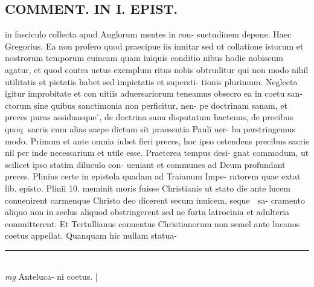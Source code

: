 \documentclass{article}
\begin{document}
\begin{pages}
\section*{COMMENT. IN I. EPIST. }\pstart in fasciculo collecta apud Anglorum mentes in con- suetudinem depone. Haec Gregorius. Ea non profero quod praecipue iis innitar sed ut collatione istorum et nostrorum temporum euincam quam iniquis conditio nibus hodie nobiscum agatur, et quod contra uetus exemplum ritus nobis obtruditur qui non modo nihil utilitatis et pietatis habet sed impietatis et supersti- tionis plurimum. Neglecta igitur improbitate et con uitiis aduersariorum teneamus obsecro ea in coetu san- ctorum sine quibus sanctimonia non perficitur, nen- pe doctrinam sanam, et preces puras assiduasque ́, de doctrina sana disputatum hactenus, de precibus quoq sacris cum alias saepe dictum sit praesentia Pauli uer- ba perstringemus modo. Primum et ante omnia iubet fieri preces, hoc ipso ostendens precibus sacris nil per inde necessarium et utile esse. Praeterea tempus desi- gnat commodum, ut scilicet ipso statim diluculo con- ueniant et communes ad Deum profundant preces. Plinius certe in epistola quadam ad Traianum Impe- ratorem quae extat lib. episto. Plinii 10. meminit moris fuisse Christianis ut stato die ante lucem conuenirent carmenque Christo deo dicerent secum inuicem, seque  sa- cramento aliquo non in scelus aliquod obstringerent sed ne furta latrocinia et adulteria committerent. Et Tertullianus conuentus Christianorum non semel ante lucanos coetus appellat. Quanquam hic nullam statua-  \pend
\vspace{0.5cm}\noindent
\vspace{0.2cm}\rule{1cm}{0.2pt}\\ 
\hspace{0.2cm}\textit{mg}
\footnotesize Anteluca- ni coetus. 
\normalsize| 

\end{pages}
\end{document}
